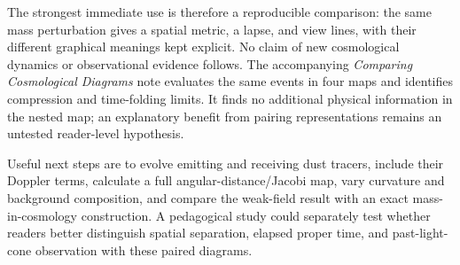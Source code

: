 The strongest immediate use is therefore a reproducible comparison:
the same mass perturbation gives a spatial metric, a lapse, and view
lines, with their different graphical meanings kept explicit. No claim
of new cosmological dynamics or observational evidence follows. The
accompanying \emph{Comparing Cosmological Diagrams} note evaluates the
same events in four maps and identifies compression and time-folding
limits. It finds no additional physical information in the nested map;
an explanatory benefit from pairing representations remains an untested
reader-level hypothesis.

Useful next steps are to evolve emitting and receiving dust tracers,
include their Doppler terms, calculate a full angular-distance/Jacobi
map, vary curvature and background composition, and compare the weak-field
result with an exact mass-in-cosmology construction. A pedagogical study
could separately test whether readers better distinguish spatial
separation, elapsed proper time, and past-light-cone observation with
these paired diagrams.

